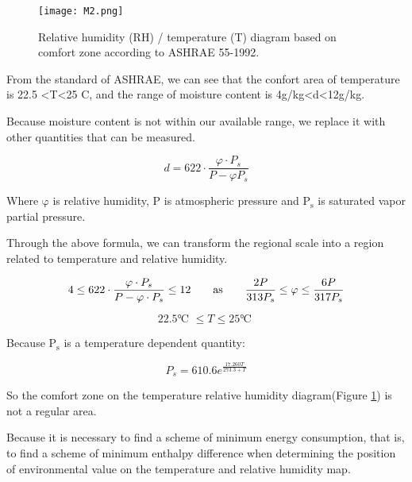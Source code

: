 \documentclass{mcmthesis}
\begin{document}
				\begin{figure}[h]
					\small
					\centering
					\texttt{[image: M2.png]}
					\caption{Relative humidity (RH) / temperature (T) diagram
						based on comfort zone according to ASHRAE 55-1992.} \label{fig:TvsRH2}
				\end{figure}
			
			From the standard of ASHRAE, we can see that the confort area of temperature is 22.5 <T<25 C, and the range of moisture content is 4g/kg<d<12g/kg.
			
			Because moisture content is not within our available range, we replace it with other quantities that can be measured.
			
			\begin{equation}
				d = 622 \cdot \frac{\varphi \cdot P_s}{P-\varphi P_s}
			\end{equation}
			
			Where $\mathrm{\varphi}$ is relative humidity, $\mathrm{P}$ is atmospheric pressure and $\mathrm{P_s}$ is saturated vapor partial pressure.
			
			Through the above formula, we can transform the regional scale into a region related to temperature and relative humidity.
			
			\begin{equation}
				4 \leq 622 \cdot \frac{\varphi \cdot P_s}{P-\varphi \cdot P_s} \leq 12 \text{\qquad as\qquad } \frac{2P}{313P_s} \leq \varphi \leq \frac{6P}{317P_s}
			\end{equation}
			
			\begin{equation}
				22.5 \text{℃ } \leq T \leq 25 \text{℃ } 
			\end{equation}
			
			Because $\mathrm{P_s}$ is a temperature dependent quantity:
			
			\begin{equation}
			P_s = 610.6e^{\frac{17.260T}{273.3+T}}
			\end{equation}
			
			So the comfort zone on the temperature relative humidity diagram(Figure \ref{fig:TvsRH2}) is not a regular area.
			
			Because it is necessary to find a scheme of minimum energy consumption, that is, to find a scheme of minimum enthalpy difference when determining the position of environmental value on the temperature and relative humidity map.
			
\end{document}
